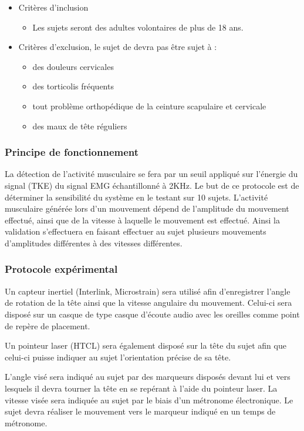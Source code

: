 \documentclass[letterpaper, twoside, 12pt, memoire, creativecommons, hyperref]{thETS}
\begin{document}
\begin{itemize}
 \item Critères d'inclusion
 \begin{itemize}
 	\item Les sujets seront des adultes volontaires de plus de 18 ans.
 \end{itemize}
 \item Critères d'exclusion, le sujet de devra pas être sujet à :
  \begin{itemize}
 	\item des douleurs cervicales
 	\item des torticolis fréquents
 	\item tout problème orthopédique de la ceinture scapulaire et cervicale
 	\item des maux de tête réguliers
 \end{itemize}
\end{itemize}


\subsubsection{Principe de fonctionnement}

La détection de l’activité musculaire se fera par un seuil appliqué sur l’énergie du signal  (TKE) du signal EMG échantillonné à 2KHz. Le but de ce protocole est de déterminer la sensibilité du système en le testant sur 10 sujets. L’activité musculaire générée lors d’un mouvement dépend de l’amplitude du mouvement effectué, ainsi que de la vitesse à laquelle le mouvement est effectué. Ainsi la validation s’effectuera en faisant effectuer au sujet plusieurs mouvements d’amplitudes différentes à des vitesses différentes. 

\subsubsection{Protocole expérimental}

Un capteur inertiel (Interlink, Microstrain) sera utilisé afin d’enregistrer l’angle de rotation de la tête ainsi que la vitesse angulaire du mouvement. Celui-ci sera disposé sur un casque de type casque d’écoute audio avec les oreilles comme point de repère de placement. 

Un pointeur laser (HTCL) sera également disposé sur la tête du sujet afin que celui-ci puisse indiquer au sujet l’orientation précise de sa tête.
 
L’angle visé sera indiqué au sujet par des marqueurs disposés devant lui et vers lesquels il devra tourner la tête en se repérant à l’aide du pointeur laser. La vitesse visée sera indiquée au sujet par le biais d’un métronome électronique. Le sujet devra réaliser le mouvement vers le marqueur indiqué en un temps de métronome. 
\end{document}
